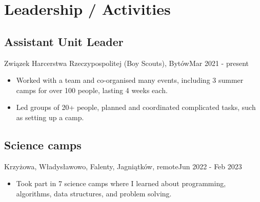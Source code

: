 \section{Leadership / Activities}
\subsection{Assistant Unit Leader}{Związek Harcerstwa Rzeczypospolitej (Boy Scouts), Bytów}{Mar 2021 - present}
\begin{itemize}
    \item Worked with a team and co-organised many events, including 3 summer camps for over 100 people, lasting 4 weeks each. 
    \item Led groups of 20+ people, planned and coordinated complicated tasks, such as setting up a camp.
\end{itemize}

\subsection{Science camps}{Krzyżowa, Władysławowo, Falenty, Jagniątków, remote}{Jun 2022 - Feb 2023}
\begin {itemize}
    \item Took part in 7 science camps where I learned about programming, algorithms, data structures, and problem solving.
\end{itemize}

\vspace{1em}
